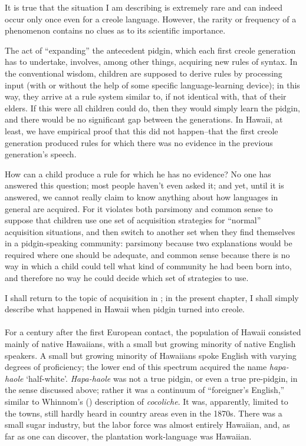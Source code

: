 
It is true that the situation I am describing is extremely rare and can indeed occur only once even for a creole language. However, the rarity or frequency of a phenomenon contains no clues as to its scientific importance.

The act of ``expanding'' the antecedent pidgin, which each
first creole generation has to undertake, involves, among other things, acquiring new rules of syntax. In the conventional wisdom, children are supposed to derive rules by processing input (with or without the help of some specific language-learning device);  in this way, they arrive at a rule system similar to, if not identical with, that of their elders. If this were all children could do, then they would simply learn the pidgin, and there would be no significant gap between the generations. In Hawaii, at least, we have empirical proof that this did not happen--that the first creole generation produced rules for which there was no evidence in the previous generation's speech.

How can a child produce a rule for which he has no evidence? No one has answered this question; most people haven't even asked it; and yet, until it is answered, we cannot really claim to know any\-thing about how languages in general are acquired. For it violates both parsimony and common sense to suppose that children use one set of acquisition strategies for ``normal'' acquisition situations, and then switch to another set when they find themselves in a pidgin-speaking community: parsimony because two explanations would be required where one should be adequate, and common sense because there is no way in which a child could tell what kind of community he had been born into, and therefore no way he could decide which
set of strategies to use.

I shall return to the topic of acquisition in ; in the present chapter, I shall simply describe what happened in Hawaii when pidgin turned into creole.\\\\
For a century after the first European contact, the population of Hawaii consisted mainly of native Hawaiians, with a small but growing minority of native English speakers. A small but growing
minority of Hawaiians spoke English with varying degrees of profi\-ciency; the lower end of this spectrum acquired the name \textit{hapa-haole} `half-white'. \textit{Hapa-haole} was not a true pidgin, or even a true pre-pidgin, in the sense discussed above; rather it was a continuum of ``foreigner's English,'' similar to Whinnom's (\citeyear{Whinnom1971}) description of \textit{cocoliche}. It was, apparently, limited to the towns, still hardly heard in country areas even in the 1870s. There was a small sugar industry, but the labor force was almost entirely Hawaiian, and, as far as one can discover, the plantation work-language was Hawaiian.

